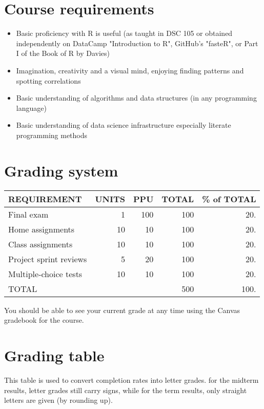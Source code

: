 \documentclass[11pt]{article}
\begin{document}
\section{Course requirements}
\label{sec:org3e9437b}

\begin{itemize}
\item Basic proficiency with R is useful (as taught in DSC 105 or obtained
independently on DataCamp "Introduction to R", GitHub's "fasteR", or
Part I of the Book of R by Davies)
\item Imagination, creativity and a visual mind, enjoying finding patterns
and spotting correlations
\item Basic understanding of algorithms and data structures (in any
programming language)
\item Basic understanding of data science infrastructure especially
literate programming methods
\end{itemize}

\section{Grading system}
\label{sec:org9b9b4e9}

\begin{center}
\begin{tabular}{lrrrr}
REQUIREMENT & UNITS & PPU & TOTAL & \% of TOTAL\\
\hline
Final exam & 1 & 100 & 100 & 20.\\
Home assignments & 10 & 10 & 100 & 20.\\
Class assignments & 10 & 10 & 100 & 20.\\
Project sprint reviews & 5 & 20 & 100 & 20.\\
Multiple-choice tests & 10 & 10 & 100 & 20.\\
\hline
TOTAL &  &  & 500 & 100.\\
\hline
\end{tabular}
\end{center}

You should be able to see your current grade at any time using the
Canvas gradebook for the course.

\section{Grading table}
\label{sec:org25534ad}

This table is used to convert completion rates into letter
grades. for the midterm results, letter grades still carry signs,
while for the term results, only straight letters are given (by
rounding up).
\end{document}
